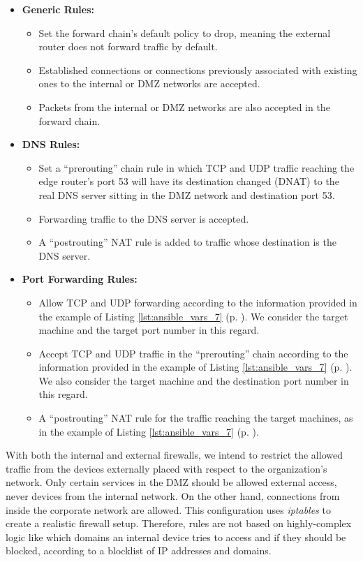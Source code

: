 \begin{itemize}
    \item \textbf{Generic Rules:}
        \begin{itemize}
            \item Set the forward chain's default policy to drop, meaning the external router does not forward traffic by default.
            \item Established connections or connections previously associated with existing ones to the internal or DMZ networks are accepted.
            \item Packets from the internal or DMZ networks are also accepted in the forward chain.
        \end{itemize}
    \item \textbf{DNS Rules:}
        \begin{itemize}
            \item Set a ``prerouting'' chain rule in which TCP and UDP traffic reaching the edge router's port 53 will have its destination changed (DNAT) to the real DNS server sitting in the DMZ network and destination port 53.
            \item Forwarding traffic to the DNS server is accepted.
            \item A ``postrouting'' NAT rule is added to traffic whose destination is the DNS server.
        \end{itemize}
    \item \textbf{Port Forwarding Rules:}
        \begin{itemize}
            \item Allow TCP and UDP forwarding according to the information provided in the example of Listing \ref{lst:ansible_vars_7} (p. \pageref{lst:ansible_vars_7}). We consider the target machine and the target port number in this regard.
            \item Accept TCP and UDP traffic in the ``prerouting'' chain according to the information provided in the example of Listing \ref{lst:ansible_vars_7} (p. \pageref{lst:ansible_vars_7}). We also consider the target machine and the destination port number in this regard.
            \item A ``postrouting'' NAT rule for the traffic reaching the target machines, as in the example of Listing \ref{lst:ansible_vars_7} (p. \pageref{lst:ansible_vars_7}).
        \end{itemize}
\end{itemize}

With both the internal and external firewalls, we intend to restrict the allowed traffic from the devices externally placed with respect to the organization's network. Only certain services in the DMZ should be allowed external access, never devices from the internal network. On the other hand, connections from inside the corporate network are allowed. This configuration uses \textit{iptables} to create a realistic firewall setup. Therefore, rules are not based on highly-complex logic like which domains an internal device tries to access and if they should be blocked, according to a blocklist of IP addresses and domains.

